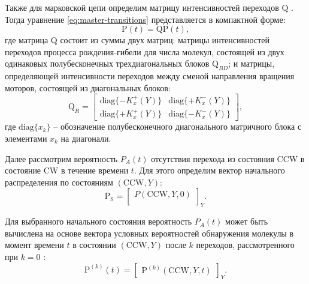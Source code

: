 Также для марковской цепи определим матрицу интенсивностей переходов $\boldsymbol{\mathrm{Q}}$ \cite{kapmen_stochastic_1990}. Тогда уравнение \cref{eq:master-transitions} представляется в компактной форме: 
\begin{equation}
    \boldsymbol{\mathrm{P}}(t) = \boldsymbol{\mathrm{Q}} \boldsymbol{\mathrm{P}}(t),
    \label{eq:master-transitions-compact}
\end{equation}
где матрица $\boldsymbol{\mathrm{Q}}$ состоит из суммы двух матриц: матрицы интенсивностей переходов процесса рождения-гибели для числа молекул, состоящей из двух одинаковых полубесконечных трехдиагональных блоков $\boldsymbol{\mathrm{Q}}_{BD}$; и матрицы, определяющей интенсивности переходов между сменой направления вращения моторов, состоящей из диагональных блоков:
\begin{equation}
    \boldsymbol{\mathrm{Q}}_{R} = 
    \begin{bmatrix} \mathrm{diag}\{-K^+_x (Y)\}&\mathrm{diag}\{+K^-_x (Y)\}\\ \mathrm{diag}\{+K^+_x (Y)\}&\mathrm{diag}\{-K^-_x (Y) \} \end{bmatrix},
    \label{eq:transition-block}
\end{equation}
где $\mathrm{diag}\{x_k\}$ -- обозначение полубесконечного диагонального матричного блока с элементами $x_k$ на диагонали.

Далее рассмотрим вероятность $P_A(t)$ отсутствия перехода из состояния CCW в состояние CW в течение времени $t$. Для этого определим вектор начального распределения по состояниям $(\mathrm{CCW}, Y)$:
\begin{equation}
    \boldsymbol{\mathrm{P_S}} = 
    \begin{bmatrix} P(\mathrm{CCW}, Y, 0)\\ \end{bmatrix}_Y.
    \label{eq:start-prob}
\end{equation}

Для выбранного начального состояния вероятность $P_A(t)$ может быть вычислена на основе вектора условных вероятностей обнаружения молекулы в момент времени $t$ в состоянии $(\mathrm{CCW}, Y)$ после $k$ переходов, рассмотренного при $k=0$ \cite{mordovina_full-counting_2013}: 
\begin{equation}
    \boldsymbol{\mathrm{P}}^{(k)}(t) = \begin{bmatrix} \boldsymbol{\mathrm{P}}^{(k)}(\mathrm{CCW}, Y, t)\end{bmatrix}_Y.
    \label{eq:conditioned-transitions}
\end{equation}

